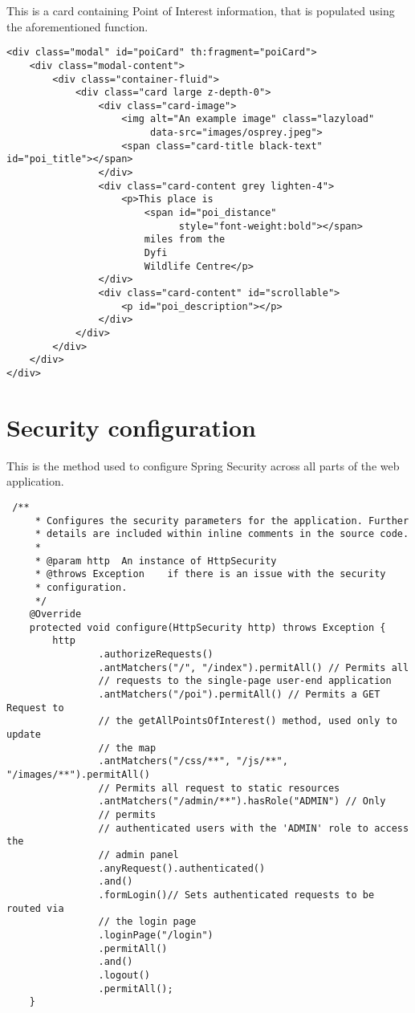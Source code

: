 This is a card containing Point of Interest information, that is populated using the aforementioned function.

\begin{verbatim}
<div class="modal" id="poiCard" th:fragment="poiCard">
    <div class="modal-content">
        <div class="container-fluid">
            <div class="card large z-depth-0">
                <div class="card-image">
                    <img alt="An example image" class="lazyload"
                         data-src="images/osprey.jpeg">
                    <span class="card-title black-text" id="poi_title"></span>
                </div>
                <div class="card-content grey lighten-4">
                    <p>This place is
                        <span id="poi_distance"
                              style="font-weight:bold"></span>
                        miles from the
                        Dyfi
                        Wildlife Centre</p>
                </div>
                <div class="card-content" id="scrollable">
                    <p id="poi_description"></p>
                </div>
            </div>
        </div>
    </div>
</div>
\end{verbatim}

\section{Security configuration}
\label{securitymethod}

This is the method used to configure Spring Security across all parts of the web application.

\begin{verbatim}
 /**
     * Configures the security parameters for the application. Further
     * details are included within inline comments in the source code.
     *
     * @param http  An instance of HttpSecurity
     * @throws Exception    if there is an issue with the security
     * configuration.
     */
    @Override
    protected void configure(HttpSecurity http) throws Exception {
        http
                .authorizeRequests()
                .antMatchers("/", "/index").permitAll() // Permits all
                // requests to the single-page user-end application
                .antMatchers("/poi").permitAll() // Permits a GET Request to
                // the getAllPointsOfInterest() method, used only to update
                // the map
                .antMatchers("/css/**", "/js/**", "/images/**").permitAll()
                // Permits all request to static resources
                .antMatchers("/admin/**").hasRole("ADMIN") // Only
                // permits
                // authenticated users with the 'ADMIN' role to access the
                // admin panel
                .anyRequest().authenticated()
                .and()
                .formLogin()// Sets authenticated requests to be routed via
                // the login page
                .loginPage("/login")
                .permitAll()
                .and()
                .logout()
                .permitAll();
    }
\end{verbatim}